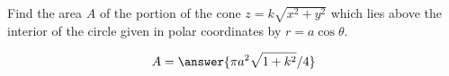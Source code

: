 \documentclass{ximera}
\author{David Guichard \and Neal Koblitz \and H. Jerome Keisler \and Albert Scheller \and Barry Balof \and Mike Wills \and Matthew Carr}
\begin{document}
\begin{exercise}




Find the area $A$ of the portion of the cone $z=k\sqrt{x^2+y^2}$ which lies above the interior of the circle given in polar coordinates by $r=a \cos\theta$.

\begin{prompt}
\[
A=\answer{\pi a^2 \sqrt{1+k^2}/4}
\]
\end{prompt}


\end{exercise}
\end{document}
